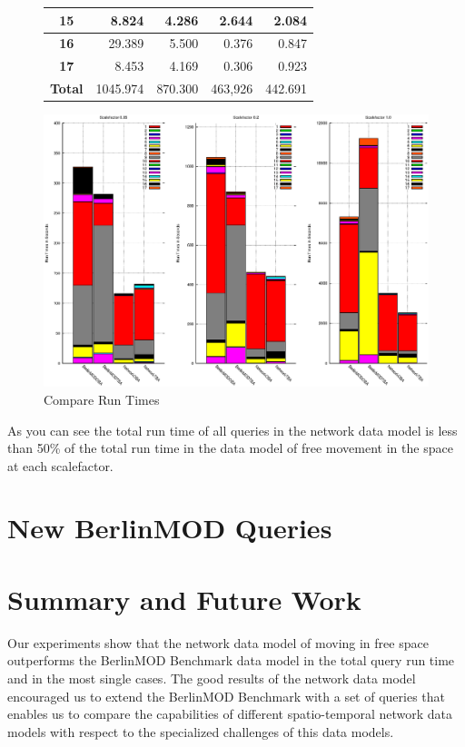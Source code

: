 \documentclass[a4paper]{article}
\newcommand{\bmodb} {BerlinMOD Benchmark}
\begin{document}
\begin{figure}[h]
\begin{minipage}{0.5\linewidth}
\begin{tiny}
\begin{tabular}{|c|r|r|r|r|}
        \hline
        \textbf{15}&8.824&4.286&2.644&2.084\\
        \hline
        \textbf{16}&29.389&5.500&0.376&0.847\\
        \hline
        \textbf{17}&8.453&4.169&0.306&0.923\\
        \hline
        \textbf{Total}&1045.974&870.300&463,926&442.691\\
        \hline
      \end{tabular}
    \end{tiny}
  \end{minipage}\hfill
  \begin{minipage}{0.5\textwidth}
      \includegraphics[width=0.8\linewidth]{compruntimesall.eps}
  \end{minipage}
 \caption{Compare Run Times}
 \label{fig:compruntimes}
\end{figure}
As you can see the total run time of all queries in the network data model is less than 50\% of the total run time in the data model of free movement in the space at each scalefactor.


\section{New BerlinMOD Queries}
\label{sec:newqueries}
\section{Summary and Future Work}
\label{sec:summary}
Our experiments show that the network data model of moving in free space
 outperforms the \bmodb{} data model in the total query run time and in the most
single cases. The good results of the network data model encouraged us to extend
the \bmodb{} with a set of queries that enables us to compare the capabilities of
 different spatio-temporal network data models with respect to the specialized
 challenges of this data models.

{}

\end{document}

